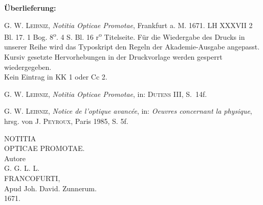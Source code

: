       
               
                \begin{ledgroupsized}[r]{120mm}
                \footnotesize 
                \pstart                
                \noindent\textbf{\"{U}berlieferung:}   
                \pend
                \end{ledgroupsized}
            
              
                            \begin{ledgroupsized}[r]{114mm}
                            \footnotesize 
                            \pstart \parindent -6mm
                            \textsc{G. W. Leibniz}, \textit{Notitia Opticae Promotae}, Frankfurt a. M. 1671. LH XXXVII 2 Bl. 17. 1 Bog. 8\textsuperscript{o}. 4 S. 
 Bl. 16 r\textsuperscript{o} Titelseite. F\"{u}r die Wiedergabe des Drucks in unserer Reihe wird das Typoskript den Regeln der Akademie-Ausgabe angepasst. Kursiv gesetzte Hervorhebungen in der Druckvorlage werden gesperrt wiedergegeben.\\Kein Eintrag in KK 1 oder Cc 2. \pend
                            \end{ledgroupsized}
              
                            \begin{ledgroupsized}[r]{114mm}
                            \footnotesize 
                            \pstart \parindent -6mm
                            \textsc{G. W. Leibniz}, \textit{Notitia Opticae Promotae}, in: \textsc{Dutens} III, S.~14f. \pend
                            \end{ledgroupsized}
              
                            \begin{ledgroupsized}[r]{114mm}
                            \footnotesize 
                            \pstart \parindent -6mm
                            \textsc{G. W. Leibniz}, \textit{Notice de l'optique avanc\'{e}e}, in: \textit{Oeuvres concernant la physique}, hrsg. von \textsc{J. Peyroux}, Paris 1985, S. 5f.\pend
                            \end{ledgroupsized}
                \vspace*{8mm}
                \pstart 
                \normalsize
            \centering [17 r\textsuperscript{o}] NOTITIA\\  OPTICAE PROMOTAE.\\  Autore\\  G. G. L. L.\\  FRANCOFURTI,\\ Apud Joh. David. Zunnerum.\\  1671. \pend \vspace{1.0ex} \pstart